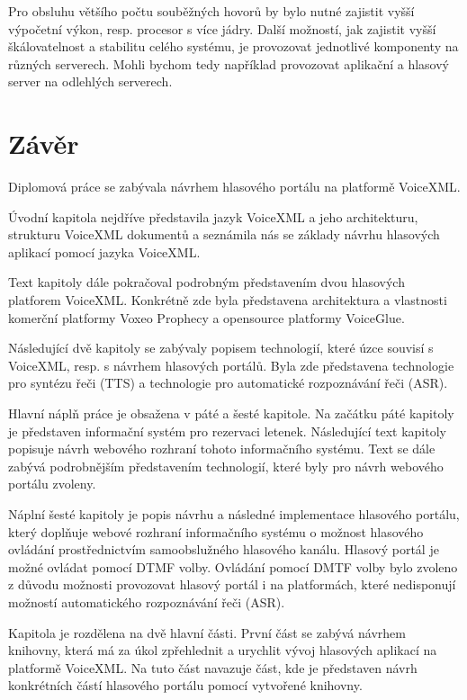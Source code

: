 \documentclass[ing,male,java,dept460,twoside]{diploma}						%
\begin{document}
Pro obsluhu většího počtu souběžných hovorů by bylo nutné zajistit vyšší výpočetní výkon, resp. procesor s více jádry. Další možností, jak zajistit vyšší škálovatelnost a stabilitu celého systému, je provozovat jednotlivé komponenty na různých serverech. Mohli bychom tedy například provozovat aplikační a hlasový server na odlehlých serverech.

\section{Závěr}
\label{sec:Conclusion}
Diplomová práce se zabývala návrhem hlasového portálu na platformě VoiceXML.

Úvodní kapitola nejdříve představila jazyk VoiceXML a jeho architekturu, strukturu VoiceXML dokumentů a seznámila nás se základy návrhu hlasových aplikací pomocí jazyka VoiceXML.

Text kapitoly dále pokračoval podrobným představením dvou hlasových platforem VoiceXML. Konkrétně zde byla představena architektura a vlastnosti komerční platformy Voxeo Prophecy a opensource platformy VoiceGlue.

Následující dvě kapitoly se zabývaly popisem technologií, které úzce souvisí s VoiceXML, resp. s návrhem hlasových portálů. Byla zde představena technologie pro syntézu řeči (TTS) a technologie pro automatické rozpoznávání řeči (ASR).

Hlavní náplň práce je obsažena v páté a šesté kapitole. Na začátku páté kapitoly je představen informační systém pro rezervaci letenek. Následující text kapitoly popisuje návrh webového rozhraní tohoto informačního systému. Text se dále zabývá podrobnějším představením technologií, které byly pro návrh webového portálu zvoleny.

Náplní šesté kapitoly je popis návrhu a následné implementace hlasového portálu, který doplňuje webové rozhraní informačního systému o možnost hlasového ovládání prostřednictvím samoobslužného hlasového kanálu. Hlasový portál je možné ovládat pomocí DTMF volby. Ovládání pomocí DMTF volby bylo zvoleno z důvodu možnosti provozovat hlasový portál i na platformách, které nedisponují možností automatického rozpoznávání řeči (ASR).

Kapitola je rozdělena na dvě hlavní části. První část se zabývá návrhem knihovny, která má za úkol zpřehlednit a urychlit vývoj hlasových aplikací na platformě VoiceXML. Na tuto část navazuje část, kde je představen návrh konkrétních částí hlasového portálu pomocí vytvořené knihovny.
\end{document}
